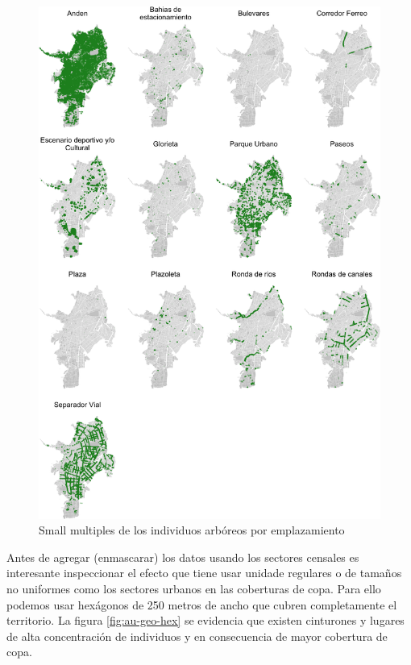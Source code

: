 \documentclass[12pt,]{book}
\begin{document}
\begin{figure}
\includegraphics[width=1\linewidth]{tesis-unigis_files/figure-latex/au-geo-emp-1} \caption{Small multiples de los individuos arbóreos por emplazamiento}\label{fig:au-geo-emp}
\end{figure}

Antes de agregar (enmascarar) los datos usando los sectores censales es
interesante inspeccionar el efecto que tiene usar unidade regulares o de
tamaños no uniformes como los sectores urbanos en las coberturas de
copa. Para ello podemos usar hexágonos de 250 metros de ancho que cubren
completamente el territorio. La figura \ref{fig:au-geo-hex} se evidencia
que existen cinturones y lugares de alta concentración de individuos y
en consecuencia de mayor cobertura de copa.
\end{document}
